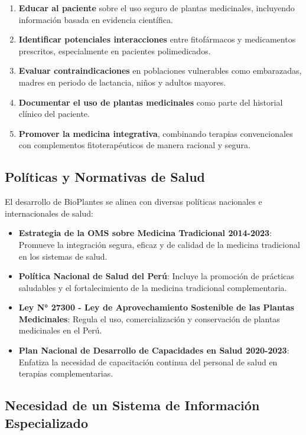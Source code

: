 \documentclass[12pt,a4paper]{article}
\begin{document}
\begin{enumerate}[label=\alph*)]
    \item \textbf{Educar al paciente} sobre el uso seguro de plantas medicinales, incluyendo información basada en evidencia científica.
    \item \textbf{Identificar potenciales interacciones} entre fitofármacos y medicamentos prescritos, especialmente en pacientes polimedicados.
    \item \textbf{Evaluar contraindicaciones} en poblaciones vulnerables como embarazadas, madres en periodo de lactancia, niños y adultos mayores.
    \item \textbf{Documentar el uso de plantas medicinales} como parte del historial clínico del paciente.
    \item \textbf{Promover la medicina integrativa}, combinando terapias convencionales con complementos fitoterapéuticos de manera racional y segura.
\end{enumerate}

\subsection{Políticas y Normativas de Salud}

El desarrollo de BioPlantes se alinea con diversas políticas nacionales e internacionales de salud:

\begin{itemize}
    \item \textbf{Estrategia de la OMS sobre Medicina Tradicional 2014-2023}\cite{WHO2013}: Promueve la integración segura, eficaz y de calidad de la medicina tradicional en los sistemas de salud.
    \item \textbf{Política Nacional de Salud del Perú}: Incluye la promoción de prácticas saludables y el fortalecimiento de la medicina tradicional complementaria.
    \item \textbf{Ley N° 27300 - Ley de Aprovechamiento Sostenible de las Plantas Medicinales}: Regula el uso, comercialización y conservación de plantas medicinales en el Perú.
    \item \textbf{Plan Nacional de Desarrollo de Capacidades en Salud 2020-2023}: Enfatiza la necesidad de capacitación continua del personal de salud en terapias complementarias.
\end{itemize}

\subsection{Necesidad de un Sistema de Información Especializado}
\end{document}
